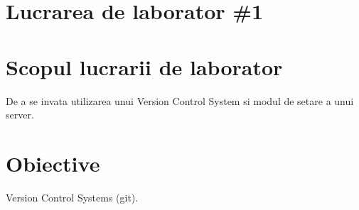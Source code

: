 \section*{Lucrarea de laborator \#1}

\section{Scopul lucrarii de laborator}
De a se invata utilizarea unui Version Control System si modul de setare a unui server.
\section{Obiective}
Version Control Systems (git).

\clearpage
